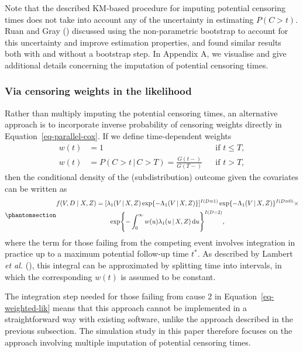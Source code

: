 \documentclass[
  letterpaper,
  DIV=11,
  numbers=noendperiod]{scrreprt}
\newcommand{\given}{\,|\,}
\newcommand\diff{\mathop{}\!\mathrm{d}}
\begin{document}
Note that the described KM-based procedure for imputing potential
censoring times does not take into account any of the uncertainty in
estimating \(P(C > t)\). Ruan and Gray
() discussed
using the non-parametric bootstrap to account for this uncertainty and
improve estimation properties, and found similar results both with and
without a bootstrap step. In Appendix A, we visualise and give
additional details concerning the imputation of potential censoring
times.

\subsubsection{Via censoring weights in the
likelihood}\label{via-censoring-weights-in-the-likelihood}

Rather than multiply imputing the potential censoring times, an
alternative approach is to incorporate inverse probability of censoring
weights directly in Equation~\ref{eq-parallel-cox}. If we define
time-dependent weights \begin{equation*}
    \begin{aligned}
        w(t) &= 1 && \text{if } t \leq T,\\
        w(t) &= P(C > t \given C > T) = \frac{G(t-)}{G(T-)} && \text{if } t > T,
    \end{aligned}
\end{equation*} then the conditional density of the (subdistribution)
outcome given the covariates can be written as
\begin{equation}\phantomsection\label{eq-weighted-lik}{
\begin{aligned}
    f(V, D \mid X, Z) &= [\lambda_1(V \given X, Z)\exp\{- \Lambda_1(V \given X, Z)\}]^{I(D = 1)}\exp\{- \Lambda_1(V \given X, Z)\}^{I(D = 0)} \times  \\
    &\qquad \exp\Biggl\{- \int_{0}^{\infty}w(u)\lambda_1(u\given X, Z)\diff u\Biggr\}^{I(D = 2)}, 
\end{aligned}
}\end{equation} where the term for those failing from the competing
event involves integration in practice up to a maximum potential
follow-up time \(t^*\). As described by Lambert \emph{et al.}
(), this
integral can be approximated by splitting time into intervals, in which
the corresponding \(w(t)\) is assumed to be constant.

The integration step needed for those failing from cause 2 in
Equation~\ref{eq-weighted-lik} means that this approach cannot be
implemented in a straightforward way with existing software, unlike the
approach described in the previous subsection. The simulation study in
this paper therefore focuses on the approach involving multiple
imputation of potential censoring times.
\end{document}
